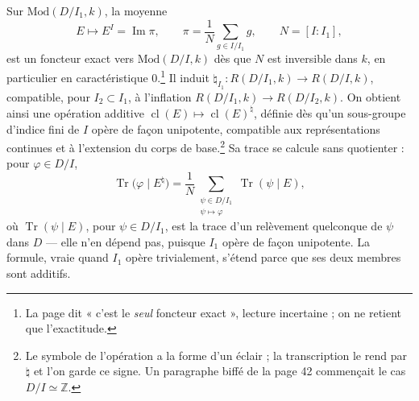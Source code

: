 \documentclass[11pt,a4paper]{article}
\begin{document}
Sur $\mathrm{Mod}(D/I_1, k)$, la moyenne
\[
  E \longmapsto E^{I} = \operatorname{Im}\pi, \qquad
  \pi = \frac{1}{N}\sum_{g \in I/I_1} g, \qquad N = [I : I_1],
\]
est un foncteur exact vers $\mathrm{Mod}(D/I, k)$ dès que $N$ est inversible
dans $k$, en particulier en caractéristique $0$.\footnote{La page dit « c'est
le \emph{seul} foncteur exact », lecture incertaine ; on ne retient que
l'exactitude.} Il induit
$\natural_{I_1} : R(D/I_1, k) \to R(D/I, k)$, compatible, pour $I_2 \subset
I_1$, à l'inflation $R(D/I_1, k) \to R(D/I_2, k)$. On obtient ainsi une
opération additive $\operatorname{cl}(E) \mapsto \operatorname{cl}(E)^{\natural}$,
définie dès qu'un sous-groupe d'indice fini de $I$ opère de façon unipotente,
compatible aux représentations continues et à l'extension du corps de
base.\footnote{Le symbole de l'opération a la forme d'un éclair ; la
transcription le rend par $\natural$ et l'on garde ce signe. Un paragraphe
biffé de la page 42 commençait le cas $D/I \simeq \mathbb{Z}$.} Sa trace se
calcule sans quotienter : pour $\varphi \in D/I$,
\[
  \operatorname{Tr}\bigl(\varphi \mid E^{\natural}\bigr)
  = \frac{1}{N}\sum_{\substack{\psi \in D/I_1 \\ \psi \mapsto \varphi}}
    \operatorname{Tr}(\psi \mid E),
\]
où $\operatorname{Tr}(\psi \mid E)$, pour $\psi \in D/I_1$, est la trace d'un
relèvement quelconque de $\psi$ dans $D$ --- elle n'en dépend pas, puisque
$I_1$ opère de façon unipotente. La formule, vraie quand $I_1$ opère
trivialement, s'étend parce que ses deux membres sont additifs.
\end{document}
